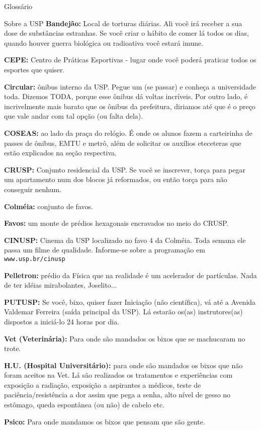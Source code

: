 \begin{secao}{Glossário}
\begin{subsecao}{Sobre a USP}
{\bf Bandejão:} Local de torturas diárias. Ali você irá receber a sua dose de
substâncias estranhas. Se você criar o hábito de comer lá todos os dias, quando
houver guerra biológica ou radioativa você estará imune.

{\bf CEPE:} Centro de Práticas Esportivas - lugar onde você poderá praticar
todos os esportes que quiser.

{\bf Circular:} ônibus interno da USP. Pegue um (se passar) e conheça a
universidade toda. Dizemos TODA, porque esse ônibus dá voltas incríveis. Por
outro lado, é incrivelmente mais barato que os ônibus da prefeitura, diriamos
até que é o preço que vale andar com tal opção (ou falta dela).

{\bf COSEAS:} ao lado da praça do relógio. É onde os alunos fazem a carteirinha
de passes de ônibus, EMTU e metrô, além de solicitar os auxílios eteceteras que
estão explicados na seção respectiva.

{\bf CRUSP:} Conjunto residencial da USP. Se você se inscrever, torça para
pegar um apartamento num dos blocos já reformados, ou então torça para não
conseguir nenhum.

{\bf Colméia:} conjunto de favos.

{\bf Favos:} um monte de prédios hexagonais encravados no meio do CRUSP.

{\bf CINUSP:} Cinema da USP localizado no favo 4 da Colméia. Toda semana ele
passa um filme de qualidade. Informe-se sobre a programação em {\tt www.usp.br/cinusp}

{\bf Pelletron:} prédio da Física que na realidade é um acelerador de
partículas. Nada de ter idéias mirabolantes, Joselito...

{\bf PUTUSP:} Se você, bixo, quiser fazer Iniciação (não científica), vá até a
Avenida Valdemar Ferreira (saída principal da USP). Lá estarão os(as)
instrutores(as) dispostos a iniciá-lo 24 horas por dia.

{\bf Vet (Veterinária):} Para onde são mandados os bixos que se machucaram no
trote.

{\bf H.U. (Hospital Universitário):} para onde são mandados os bixos que não
foram aceitos na Vet. Lá são realizados os tratamentos e experiências com
exposição a radiação, exposição a aspirantes a médicos, teste de
paciência/resistência a dor assim que pega a senha, alto nível de gesso no
estômago, queda espontânea (ou não) de cabelo etc.

{\bf Psico:} Para onde mandamos os bixos que pensam que são gente.

\end{subsecao}
\end{secao}
